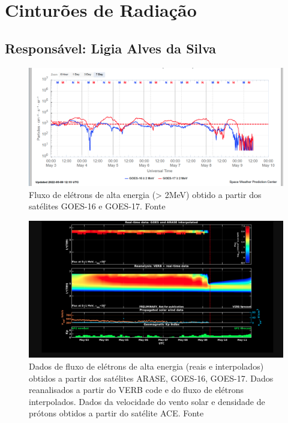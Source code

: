 \documentclass[11pt, oneside]{article}
\begin{document}
\section{Cinturões de Radiação} 
 \subsection{Responsável: Ligia Alves da Silva} 
 
\begin{figure}[H]
    
                        \centering
   
                             \includegraphics[width=14cm]{./figures//figureRadBelts_0.png}

                             \caption{ Fluxo de elétrons de alta energia (> 2MeV) obtido a partir dos satélites GOES-16 e GOES-17. Fonte}
                        \end{figure}

                     \begin{figure}[H]
    
                        \centering
   
                             \includegraphics[width=14cm]{./figures//figureRadBelts_1.png}

                             \caption{ Dados de fluxo de elétrons de alta energia (reais e interpolados) obtidos a partir dos satélites ARASE, GOES-16, GOES-17. Dados reanalisados a partir do VERB code e do fluxo de elétrons interpolados. Dados da velocidade do vento solar e densidade de prótons obtidos a partir do satélite ACE. Fonte}
                        \end{figure}
\end{document}
